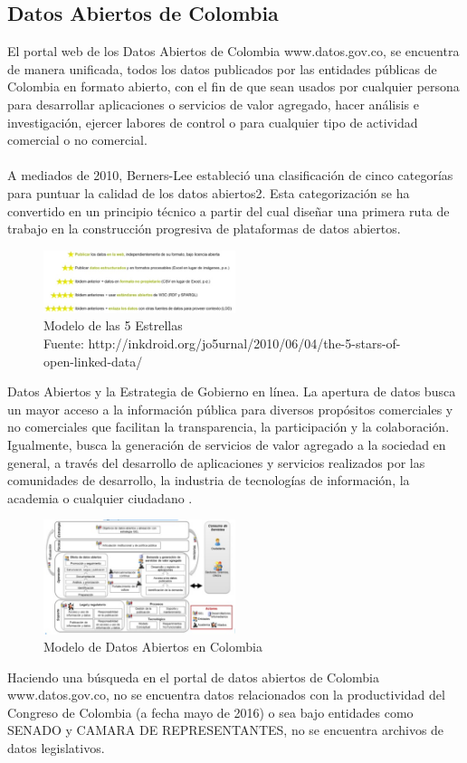 \documentclass[conference]{IEEEtran}\usepackage[]{graphicx}\usepackage[]{color}
\begin{document}
\subsection{Datos Abiertos de Colombia} 
El portal web de los Datos Abiertos de Colombia www.datos.gov.co, se encuentra de manera unificada, todos los datos publicados por las entidades públicas de Colombia en formato abierto, con el fin de que sean usados por cualquier persona para desarrollar aplicaciones o servicios de valor agregado, hacer análisis e investigación, ejercer labores de control o para cualquier tipo de actividad comercial o no comercial.      \\ \\  
A mediados de 2010, Berners-Lee estableció una clasificación de cinco categorías para puntuar la calidad de los datos abiertos2. Esta categorización se ha convertido en un principio técnico a partir del cual diseñar una primera ruta de trabajo en la construcción progresiva de plataformas de datos abiertos\cite{biblio15}.
\begin{figure}[h]
	\centering
	\includegraphics[width=0.5\textwidth]{datos-abiertos-col}
	\caption{Modelo de las 5 Estrellas \\ \small Fuente: http://inkdroid.org/jo5urnal/2010/06/04/the-5-stars-of-open-linked-data/}
\end{figure}
Datos Abiertos y la Estrategia de Gobierno en línea. La apertura de datos busca un mayor acceso a la información pública para diversos propósitos comerciales y no comerciales que facilitan la transparencia, la participación y la colaboración. Igualmente, busca la generación de servicios de valor agregado a la sociedad en general, a través del desarrollo de aplicaciones y servicios realizados por las  comunidades de desarrollo, la industria de tecnologías de información, la academia o cualquier ciudadano \cite{biblio2}.
\begin{figure}[h]
	\centering
	\includegraphics[width=0.5\textwidth]{modelo-datos-col}
	\caption{Modelo de Datos Abiertos en Colombia}
\end{figure}
Haciendo una búsqueda en el portal de datos abiertos de Colombia www.datos.gov.co, no se encuentra datos relacionados con la productividad del Congreso de Colombia (a fecha mayo de 2016) o sea bajo entidades como SENADO y CAMARA DE REPRESENTANTES, no se encuentra archivos de datos legislativos.  
\end{document}
